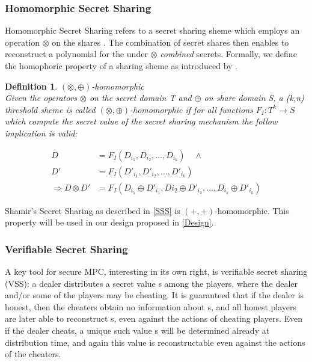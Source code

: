 \documentclass[12pt,a4paper]{scrartcl}				%
\begin{document}
\cite{smart2003}

\subsubsection{Homomorphic Secret Sharing}
Homomorphic Secret Sharing refers to a secret sharing sheme which employs an operation $\otimes$ on the shares \cite{schoenmakers1999simple}. The combination of secret shares then enables to reconstruct a polynomial for the under $\otimes$ \textit{combined} secrets. Formally, we define the homophoric property of a sharing sheme as introduced by \cite{benaloh1986secret}.


\newtheorem{HSS}{Definition}
\begin{HSS}$(\otimes,\oplus)$-homomorphic \\
	Given the operators $\otimes$ on the secret domain T and $\oplus$ on share domain S, a (k,n) threshold sheme is called $(\otimes,\oplus)$-homomorphic if for all functions $F_I:T^k\rightarrow S$ which compute the secret value of the secret sharing mechanism the follow implication is valid:
	
	\begin{align*}
						D  &= F_I(D_{i_1},D_{i_2},\ldots,D_{i_k})\quad  \wedge \\
						D' &= F_I(D'_{i_1},D'_{i_2},\ldots,D'_{i_k}) \\
		\Rightarrow	D\otimes D' &= F_I(D_{i_1}\oplus D'_{i_1},D{i_2}\oplus D'_{i_2},\ldots,D_{i_k}\oplus D'_{i_k})
	\end{align*}
	
\end{HSS}

Shamir's Secret Sharing as described in \ref{SSS} is $(+,+)$-homomorphic. This property will be used in our design proposed in \ref{Design}.

\subsubsection{Verifiable Secret Sharing}
A key tool for secure MPC, interesting in its own right, is verifiable secret sharing (VSS):
a dealer distributes a secret value s among the players, where the dealer and/or some of
the players may be cheating. It is guaranteed that if the dealer is honest, then the cheaters
obtain no information about s, and all honest players are later able to reconstruct s, even
against the actions of cheating players. Even if the dealer cheats, a unique such value s will
be determined already at distribution time, and again this value is reconstructable even
against the actions of the cheaters.\cite{cramer2009}
\end{document}
